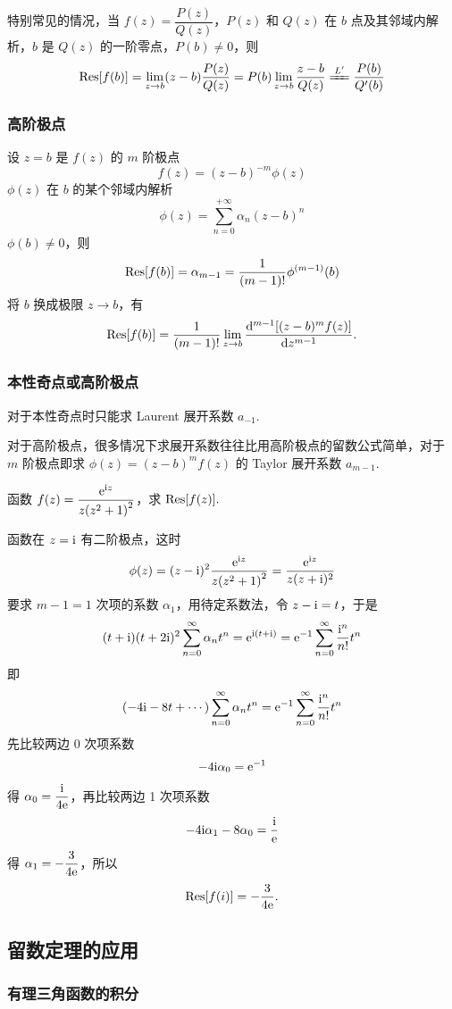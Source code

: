 特别常见的情况，当 $f(z)=\dfrac{P(z)}{Q(z)}$，$P(z)$ 和 $Q(z)$ 在 $b$ 点及其邻域内解析，$b$ 是 $Q(z)$ 的一阶零点，$P(b)\neq0$，则
$$\Res[f(b)]=\lim_{z\to b}(z-b)\dfrac{P(z)}{Q(z)}=P(b)\lim_{z\to b}\dfrac{z-b}{Q(z)}\xlongequal[]{L'}\dfrac{P(b)}{Q'(b)}$$

\subsubsection{高阶极点}

设 $z=b$ 是 $f(z)$ 的 $m$ 阶极点 $$f(z)=(z-b)^{-m}\phi(z)$$
$\phi(z)$ 在 $b$ 的某个邻域内解析 $$\phi(z)=\sum_{n=0}^{+\infty}\alpha_n(z-b)^n$$
$\phi(b)\neq0$，则 $$\Res[f(b)]=\alpha_{m-1}=\dfrac{1}{(m-1)!}\phi^{(m-1)}(b)$$
将 $b$ 换成极限 $z\to b$，有
$$\Res[f(b)]=\dfrac{1}{(m-1)!}\lim_{z\to b}\dv[m-1]{\qty[(z-b)^mf(z)]}{z}.$$

\subsubsection{本性奇点或高阶极点}

对于本性奇点时只能求 Laurent 展开系数 $a_{-1}$.

对于高阶极点，很多情况下求展开系数往往比用高阶极点的留数公式简单，对于 $m$ 阶极点即求 $\phi(z)=(z-b)^mf(z)$ 的 Taylor 展开系数 $a_{m-1}$.

\begin{example}
    函数 $f(z)=\dfrac{\mathrm{e}^{\mathrm{i} z}}{z\qty(z^2+1)^2}$，求 $\Res[f(z)].$
\end{example}
\begin{solution}
    函数在 $z=\mathrm{i}$ 有二阶极点，这时
    $$\phi(z)=(z-\mathrm{i})^2\dfrac{\mathrm{e}^{\mathrm{i} z}}{z\qty(z^2+1)^2}=\dfrac{\mathrm{e}^{\mathrm{i} z}}{z(z+\mathrm{i})^2}$$
    要求 $m-1=1$ 次项的系数 $\alpha_1$，用待定系数法，令 $z-\mathrm{i}=t$，于是
    $$(t+\mathrm{i})(t+2\mathrm{i})^2\sum_{n=0}^{\infty}\alpha_nt^n=\mathrm{e}^{\mathrm{i}(t+\mathrm{i})}=\mathrm{e}^{-1}\sum_{n=0}^{\infty}\dfrac{\mathrm{i}^n}{n!}t^n$$
    即 $$(-4\mathrm{i}-8t+\cdots)\sum_{n=0}^{\infty}\alpha_nt^n=\mathrm{e}^{-1}\sum_{n=0}^{\infty}\dfrac{\mathrm{i} ^n}{n!}t^n$$
    先比较两边 $0$ 次项系数 $$-4\mathrm{i} \alpha_0=\mathrm{e}^{-1}$$
    得 $\alpha_0=\dfrac{\mathrm{i}}{4\mathrm{e}}$，再比较两边 1 次项系数 $$-4\mathrm{i}\alpha_1-8\alpha_0=\dfrac{\mathrm{i}}{\mathrm{e}}$$
    得 $\alpha_1=-\dfrac{3}{4\mathrm{e}}$，所以 $$\Res[f(i)]=-\dfrac{3}{4\e}.$$
\end{solution}

\subsection{留数定理的应用}

\subsubsection{有理三角函数的积分}

